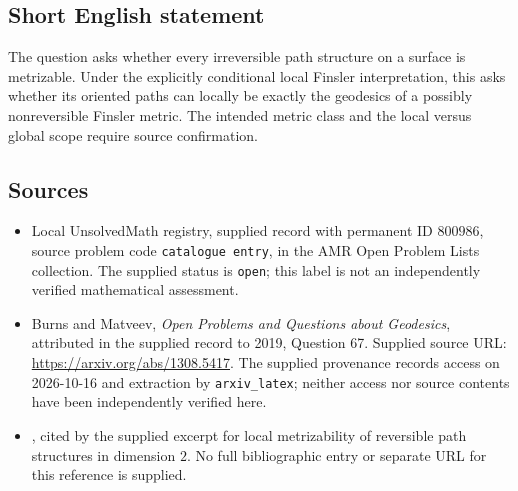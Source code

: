 \documentclass[11pt]{article}
\begin{document}
\subsection{Short English statement}
The question asks whether every irreversible path structure on a surface is metrizable. Under the explicitly conditional local Finsler interpretation, this asks whether its oriented paths can locally be exactly the geodesics of a possibly nonreversible Finsler metric. The intended metric class and the local versus global scope require source confirmation.
\subsection{Sources}
\begin{itemize}
\item Local UnsolvedMath registry, supplied record with permanent ID \(800986\), source problem code \texttt{catalogue entry}, in the AMR Open Problem Lists collection. The supplied status is \texttt{open}; this label is not an independently verified mathematical assessment.
\item Burns and Matveev, \emph{Open Problems and Questions about Geodesics}, attributed in the supplied record to 2019, Question 67. Supplied source URL: \url{https://arxiv.org/abs/1308.5417}. The supplied provenance records access on 2026-10-16 and extraction by \texttt{arxiv\_latex}; neither access nor source contents have been independently verified here.
\item [Alv-Ber2010, Theorem B], cited by the supplied excerpt for local metrizability of reversible path structures in dimension \(2\). No full bibliographic entry or separate URL for this reference is supplied.
\end{itemize}
\end{document}
